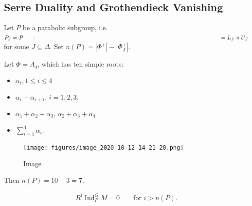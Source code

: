 \hypertarget{serre-duality-and-grothendieck-vanishing}{%
\subsection{Serre Duality and Grothendieck
Vanishing}\label{serre-duality-and-grothendieck-vanishing}}

Let \(P\) be a parabolic subgroup,
i.e.~\(P_J = P \mathrel{\vcenter{:}}= L_J \rtimes U_J\) for some
\(J\subseteq \Delta\). Set
\(n(P) = {\left\lvert {\Phi^+} \right\rvert} - {\left\lvert {\Phi^+_J} \right\rvert}\).

\begin{example}

\begin{example}

Let \(\Phi = A_4\), which has ten simple roots:

\begin{itemize}
\tightlist
\item
  \(\alpha_i, 1\leq i \leq 4\)
\item
  \(\alpha_i + \alpha_{i+1}\), \(i=1,2,3\).
\item
  \(\alpha_1 + \alpha_2 +\alpha_3\), \(\alpha_2 + \alpha_3 + \alpha_4\)
\item
  \(\sum_{i=1}^4 \alpha_i\).
\end{itemize}

\begin{figure}
\centering
\texttt{[image: figures/image\_2020-10-12-14-21-20.png]}
\caption{Image}
\end{figure}

Then \(n(P) = 10 - 3 = 7\).

\end{example}

\end{example}

\begin{theorem}

\begin{theorem}

\begin{align*}   R^i \operatorname{Ind}_P^G M = 0 \qquad \text{for } i > n(P) .\end{align*}

\end{theorem}

\end{theorem}

